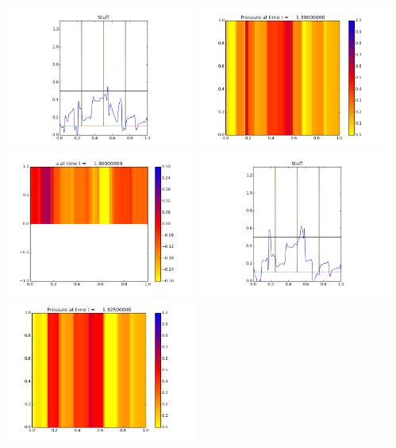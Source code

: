 \documentclass[11pt]{article}
\begin{document}
\vskip 10pt 
\includegraphics[width=0.475\textwidth]{frame0051fig3.png}
\vskip 10pt 
\includegraphics[width=0.475\textwidth]{frame0052fig0.png}
\includegraphics[width=0.475\textwidth]{frame0052fig1.png}
\vskip 10pt 
\includegraphics[width=0.475\textwidth]{frame0052fig3.png}
\vskip 10pt 
\includegraphics[width=0.475\textwidth]{frame0053fig0.png}
\end{document}
